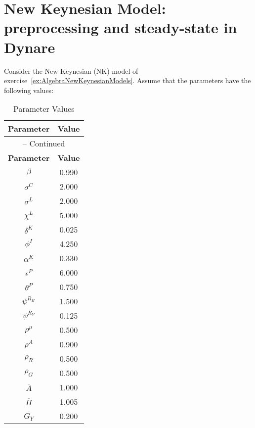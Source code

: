 \section[New Keynesian Model: preprocessing and steady-state in Dynare]{New Keynesian Model: preprocessing and steady-state in Dynare\label{ex:NewKeynesianModelPreprocessSteady}}
Consider the New Keynesian (NK) model of exercise~\ref{ex:AlgebraNewKeynesianModels}.
Assume that the parameters have the following values:
\begin{longtable}{cc}
\caption{Parameter Values}\\%
\toprule%
\multicolumn{1}{c}{\textbf{Parameter}} &
\multicolumn{1}{c}{\textbf{Value}} \\%
\midrule%
\endfirsthead%
\multicolumn{2}{c}{{\tablename} \thetable{} {--} Continued}\\%
\midrule%
\multicolumn{1}{c}{\textbf{Parameter}} &
\multicolumn{1}{c}{\textbf{Value}} \\%
\midrule%
\endhead%
\({\beta}\) 	       & 0.990\\
\({\sigma^{C}}\) 	   & 2.000\\
\({\sigma^{L}}\) 	   & 2.000\\
\({\chi^{L}}\)       & 5.000\\
\({\delta^{K}}\)     & 0.025\\
\({\phi^{I}}\)       & 4.250 \\
\({\alpha^{K}}\)     & 0.330\\
\({\epsilon^{P}}\)   & 6.000\\
\({\theta^{P}}\) 	   & 0.750\\
\({\psi^{R_{\Pi}}}\) & 1.500\\
\({\psi^{R_{Y}}}\)   & 0.125\\
\({\rho^{\mu}}\) 	   & 0.500\\
\({\rho^{A}}\) 	     & 0.900\\
\({\rho_{R}}\)       & 0.500\\
\({\rho_{G}}\)       & 0.500\\
\({\overline{A}}\)   & 1.000\\
\({\overline{\Pi}}\) & 1.005\\
\({\overline{G_Y}}\) & 0.200\\
\bottomrule%
\end{longtable}

